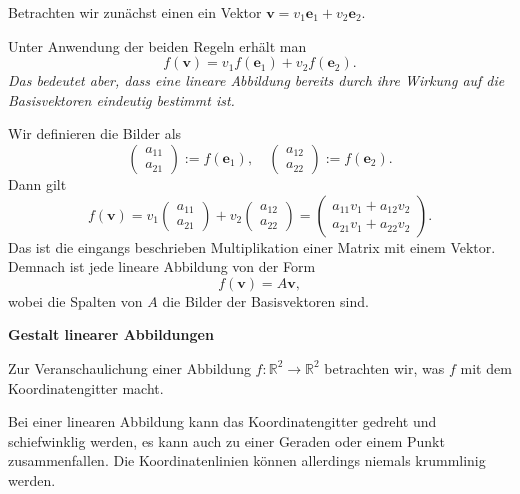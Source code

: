 \documentclass[9pt]{beamer}
\newcommand{\bv}[1]{\mathbf{#1}}
\newcommand{\R}{\mathbb R}
\newcommand{\strong}[1]{\textsf{\textbf{#1}}}
\newcommand{\parspace}{\vspace{0.8em}}
\begin{document}
\begin{frame}
Betrachten wir zunächst einen ein Vektor $\bv v = v_1\bv e_1+v_2\bv e_2$.

\parspace
Unter Anwendung der beiden Regeln erhält man\pause
\[f(\bv v) = v_1f(\bv e_1)+v_2f(\bv e_2).\]\pause
\emph{Das bedeutet aber, dass eine lineare Abbildung bereits durch ihre
Wirkung auf die Basisvektoren eindeutig bestimmt ist.}
\end{frame}

\begin{frame}
Wir definieren die Bilder als
\[\begin{pmatrix}a_{11}\\ a_{21}\end{pmatrix} := f(\bv e_1),\quad
\begin{pmatrix}a_{12}\\ a_{22}\end{pmatrix} := f(\bv e_2).\]
Dann gilt
\[f(\bv v) = v_1\begin{pmatrix}a_{11}\\ a_{21}\end{pmatrix}
+ v_2\begin{pmatrix}a_{12}\\ a_{22}\end{pmatrix}
= \begin{pmatrix}
a_{11}v_1+a_{12}v_2\\
a_{21}v_1+a_{22}v_2
\end{pmatrix}.\]\pause
Das ist die eingangs beschrieben Multiplikation einer Matrix mit einem
Vektor. Demnach ist jede lineare Abbildung von der Form
\[f(\bv v) = A\bv v,\]
wobei die Spalten von $A$ die Bilder der Basisvektoren sind.
\end{frame}

\begin{frame}
\begin{center}
\strong{Gestalt linearer Abbildungen}
\end{center}
\end{frame}

\begin{frame}
Zur Veranschaulichung einer Abbildung $f\colon\R^2\to\R^2$
betrachten wir, was $f$ mit dem Koordinatengitter macht.

\parspace
Bei einer linearen Abbildung kann das Koordinatengitter gedreht
und schiefwinklig werden, es kann auch zu einer Geraden oder einem
Punkt zusammenfallen. Die Koordinatenlinien können allerdings
niemals krummlinig werden.
\end{frame}
\end{document}
